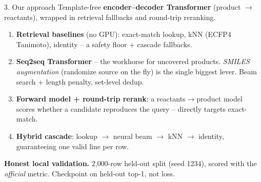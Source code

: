 \documentclass[aspectratio=169,11pt]{beamer}
\begin{document}
\begin{frame}{3. Our approach}
  Template-free \textbf{encoder--decoder Transformer} (product $\to$ reactants),
  wrapped in retrieval fallbacks and round-trip reranking.

  \begin{enumerate}
    \item \textbf{Retrieval baselines} (no GPU): exact-match lookup, kNN
      (ECFP4 Tanimoto), identity -- a safety floor + cascade fallbacks.
    \item \textbf{Seq2seq Transformer} -- the workhorse for uncovered products.
      \emph{SMILES augmentation} (randomize source on the fly) is the single
      biggest lever. Beam search + length penalty, set-level dedup.
    \item \textbf{Forward model + round-trip rerank}: a reactants$\to$product
      model scores whether a candidate reproduces the query -- directly
      targets exact-match.
    \item \textbf{Hybrid cascade}: lookup $\to$ neural beam $\to$ kNN $\to$
      identity, guaranteeing one valid line per row.
  \end{enumerate}

  \medskip
  \textbf{Honest local validation.} 2{,}000-row held-out split (seed 1234),
  scored with the \emph{official} metric. Checkpoint on held-out top-1, not loss.
\end{frame}
\end{document}
